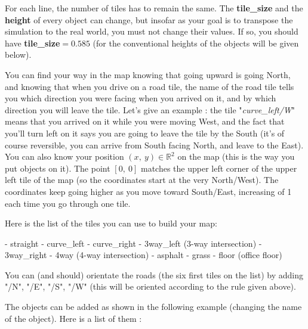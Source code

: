 For each line, the number of tiles has to remain the same.
The \textbf{tile\_size} and the \textbf{height} of every object can change, but insofar as your goal is to transpose the simulation to the real world, you must not change their values.
If so, you should have \textbf{tile\_size}$=0.585$ (for the conventional heights of the objects will be given below).

You can find your way in the map knowing that going upward is going North, and knowing that when you drive on a road tile, the name of the road tile tells you which direction you were facing when you arrived on it, and by which direction you will leave the tile.
Let's give an example : the tile "\textit{curve\_left/W}" means that you arrived on it while you were moving West, and the fact that you'll turn left on it says you are going to leave the tile by the South (it's of course reversible, you can arrive from South facing North, and leave to the East).
You can also know your position $(x,\ y)\in\mathbb{R}^2$ on the map (this is the way you put objects on it).
The point $[0,\ 0]$ matches the upper left corner of the upper left tile of the map (so the coordinates start at the very North/West).
The coordinates keep going higher as you move toward South/East, increasing of 1 each time you go through one tile.

Here is the list of the tiles you can use to build your map:

\noindent- straight\newline
\noindent- curve\_left\newline
\noindent- curve\_right\newline
\noindent- 3way\_left (3-way intersection)\newline
\noindent- 3way\_right\newline
\noindent- 4way (4-way intersection)\newline
\noindent- asphalt\newline
\noindent- grass\newline
\noindent- floor (office floor)\newline

You can (and should) orientate the roads (the six first tiles on the list) by adding "/N", "/E", "/S", "/W" (this will be oriented according to the rule given above).\newline

The objects can be added as shown in the following example (changing the name of the object). Here is a list of them :\newline

